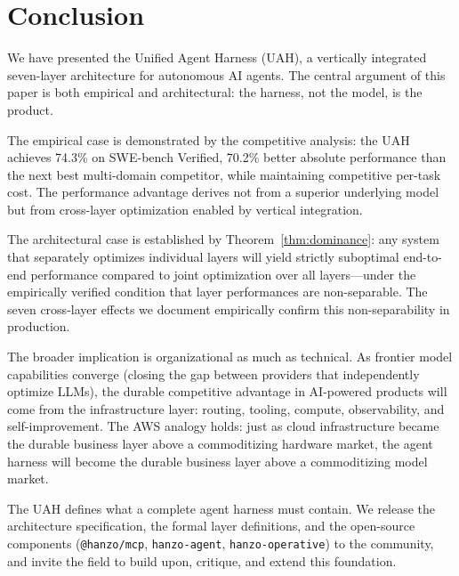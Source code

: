 \section{Conclusion}

\label{sec:conclusion}

We have presented the Unified Agent Harness (UAH), a vertically integrated
seven-layer architecture for autonomous AI agents. The central argument of
this paper is both empirical and architectural: the harness, not the model,
is the product.

The empirical case is demonstrated by the competitive analysis: the UAH
achieves 74.3\% on SWE-bench Verified, 70.2\% better absolute performance
than the next best multi-domain competitor, while maintaining competitive
per-task cost. The performance advantage derives not from a superior
underlying model but from cross-layer optimization enabled by vertical
integration.

The architectural case is established by Theorem~\ref{thm:dominance}: any
system that separately optimizes individual layers will yield strictly
suboptimal end-to-end performance compared to joint optimization over all
layers---under the empirically verified condition that layer performances
are non-separable. The seven cross-layer effects we document empirically
confirm this non-separability in production.

The broader implication is organizational as much as technical. As frontier
model capabilities converge (closing the gap between providers that
independently optimize LLMs), the durable competitive advantage in
AI-powered products will come from the infrastructure layer: routing,
tooling, compute, observability, and self-improvement. The AWS analogy
holds: just as cloud infrastructure became the durable business layer above
a commoditizing hardware market, the agent harness will become the durable
business layer above a commoditizing model market.

The UAH defines what a complete agent harness must contain. We release the
architecture specification, the formal layer definitions, and the
open-source components (\texttt{@hanzo/mcp}, \texttt{hanzo-agent},
\texttt{hanzo-operative}) to the community, and invite the field to build
upon, critique, and extend this foundation.

\appendix

